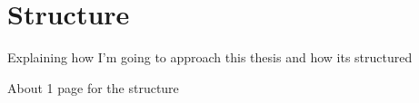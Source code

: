 
\chapter{Structure}

\label{ch:structure}

Explaining how I'm going to approach this thesis and how its structured

About 1 page for the structure

\pagebreak[1]